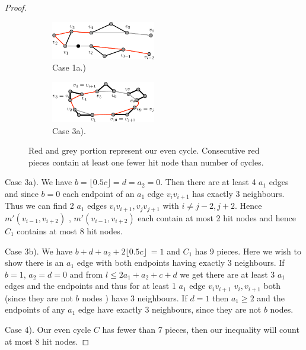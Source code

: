 \documentclass{article}
\newcommand{\0}{\mathbb{0}}
\newcommand{\1}{\mathbb{1}}
\begin{document}
\begin{proof}
\begin{figure}[h]
\begin{subfigure}[t]{0.5\textwidth}
\includegraphics[width=0.5\textwidth]{evenCase1.pdf}
\caption{Case 1a.)}\label{case1}
\end{subfigure}
\begin{subfigure}[t]{0.5\textwidth}
\includegraphics[width=0.5\textwidth]{Case3a).pdf}  
\caption{Case 3a).}\label{case 3a)}
\end{subfigure}
\caption{Red and grey portion represent our even cycle.  Consecutive red pieces contain at least one fewer hit node than number of cycles.}
\end{figure}
Case 3a). We have $b = \lfloor 0.5c \rfloor = d = a_2 =0$. Then there are at least 4 $ a_1  $ edges and since $b=0$ each endpoint of an $a_1$ edge $v_i v_{i+1}$ has exactly 3 neighbours. Thus we can find 2 $a_1$ edges $ v_i v_{i+1} , v_j v_{j+1}$ with $i \neq j-2,j+2$.  Hence $m'(v_{i-1},v_{i+2} )$  , $m'(v_{i-1},v_{i+2} )$ each contain at most 2 hit nodes and hence $C_1$ contains at most 8 hit nodes. 

Case 3b).  We have $ b+d + a_2 + 2\lfloor 0.5c \rfloor \ =1 $ and $C_1$ has 9 pieces. Here we wish to show there is an $a_1$ edge with both endpoints having exactly 3 neighbours. If $b=1$, $a_2=d=0$ and from $l \leq 2a_1 + a_2 + c +d $  we get  there are at least 3 $a_1$ edges and the endpoints and thus for at least 1 $a_1$ edge $v_iv_{i+1}$ $v_i, v_{i+1}$  both (since they are not $b$ nodes ) have 3 neighbours.   If $d=1$ then $a_1 \geq 2$ and the endpoints of any $a_1$ edge have exactly 3 neighbours, since they are not $b$ nodes.  

Case 4). Our even cycle $C$ has fewer than 7 pieces, then our inequality will count at most 8 hit nodes.
\end{proof}










\end{document}
